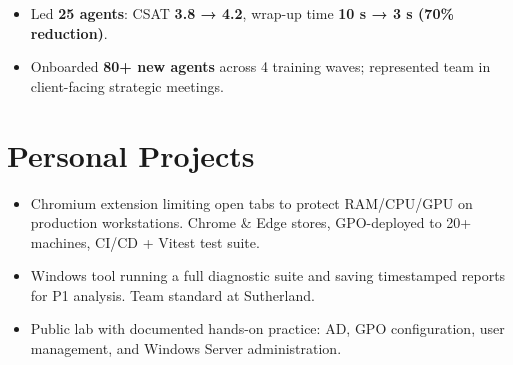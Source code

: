 \documentclass[10pt]{article}
\begin{document}
\vspace{3pt}

\begin{itemize}
  \item Led \textbf{25 agents}: CSAT \textbf{3.8 → 4.2}, wrap-up time \textbf{10 s → 3 s (70\%
        reduction)}.
  \item Onboarded \textbf{80+ new agents} across 4 training waves; represented team in
        client-facing strategic meetings.
\end{itemize}

\section{Personal Projects}

\begin{itemize}
  \item Chromium extension limiting open tabs to protect RAM/CPU/GPU on production workstations.
        Chrome \& Edge stores, GPO-deployed to 20+ machines, CI/CD + Vitest test suite.
\end{itemize}

\vspace{3pt}

\begin{itemize}
  \item Windows tool running a full diagnostic suite and saving timestamped reports for P1
        analysis. Team standard at Sutherland.
\end{itemize}

\vspace{3pt}

\begin{itemize}
  \item Public lab with documented hands-on practice: AD, GPO configuration, user management,
        and Windows Server administration.
\end{itemize}

\end{document}
